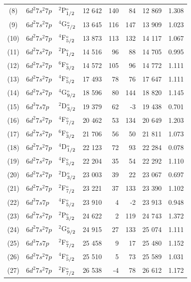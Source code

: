 \documentclass[10pt,a4paper, twoside, openright]{report}
\begin{document}
\begin{longtable}{cllrrrrr}
(8)  &   $6d^2 7s^2 7p$  &  $^2$P$^{\rm_o}_{1/2}$ &    12 642 & 140 &  84  & 12 869 & 1.308 \\ 
(9)  &  $6d^2 7s^2 7p$  &  $^4$G$^{\rm_o}_{7/2}$ &    13 645 &  116 &  147 & 13 909 & 1.023 \\ 
(10)   &  $6d^2 7s^2 7p$  &  $^4$F$^{\rm_o}_{5/2}$  &   13 873 & 113  &  132 & 14 117 & 1.067 \\ 
(11)   &  $6d^2 7s^2 7p$  &  $^2$P$^{\rm_o}_{1/2}$  &   14 516 & 96  &  88  & 14 705 & 0.995 \\ 
(12)   &  $6d^2 7s^2 7p$  &  $^6$F$^{\rm_o}_{3/2}$  &   14 572 & 105 & 96  & 14 772 & 1.111 \\ 
(13)   &  $6d^2 7s^2 7p$  &  $^4$F$^{\rm_o}_{5/2}$ &    17 493 & 78 &76  & 17 647 & 1.111 \\ 
(14)  &  $6d^2 7s^2 7p$  &  $^4$G$^{\rm_o}_{9/2}$   &  18 596 & 80 &  144  & 18 820  & 1.145 \\ 
(15)  & $6d^3 7s 7p$  &  $^2$D$^{\rm_o}_{3/2}$  &  19 379 & 62 &  -3  & 19 438 & 0.701 \\ 
 (16)  &  $6d^2 7s^2 7p$  &  $^4$F$^{\rm_o}_{7/2}$ &    20 462 & 53 & 134 & 20 649  & 1.203 \\ 
(17)  &  $6d^2 7s^2 7p$  &  $^6$F$^{\rm_o}_{3/2}$  &   21 706 & 56  & 50 & 21 811 & 1.073 \\ 
(18)  &  $6d^2 7s^2 7p$  &  $^4$D$^{\rm_o}_{1/2}$ &    22 123 & 72  & 93 & 22 284 & 0.078 \\ 
(19)   &  $6d^2 7s^2 7p$  &  $^4$F$^{\rm_o}_{5/2}$ &    22 204 & 35  & 54 & 22 292 & 1.110 \\ 
(20)  &  $6d^2 7s^2 7p$  &  $^2$D$^{\rm_o}_{3/2}$  &   23 003 & 39 & 22 & 23 067 & 0.697 \\ 
(21)  &  $6d^2 7s^2 7p$  &  $^2$F$^{\rm_o}_{7/2}$ &    23 221 & 37   & 133 & 23 390 & 1.102 \\ 
(22)  &  $6d^3 7s 7p$  &  $^4$F$^{\rm_o}_{5/2}$  &   23 910 &  4 &  -2 & 23 913 & 0.948 \\ 
(23) &   $6d^2 7s^2 7p$  &  $^2$P$^{\rm_o}_{3/2}$ &    24 622 & 2  &  119  & 24 743  & 1.372 \\ 
(24)  &   $6d^2 7s^2 7p$  &  $^2$G$^{\rm_o}_{9/2}$  &  24 915&  27  & 133 & 25 074 & 1.111 \\ 
 (25)  & $6d^3 7s 7p$  &  $^2$F$^{\rm_o}_{7/2}$ &    25 458 & 9  & 17  & 25 480 & 1.152 \\ 
(26) &   $6d^2 7s^2 7p$  &  $^4$F$^{\rm_o}_{5/2}$ &    25 510 & 5   & 73 & 25 589 & 1.031 \\ 
(27)   & $6d^2 7s^2 7p$  &  $^2$F$^{\rm_o}_{7/2}$ &    26 538 & -4   &  78 & 26 612 & 1.172 \\ 

\end{longtable}
\end{document}
